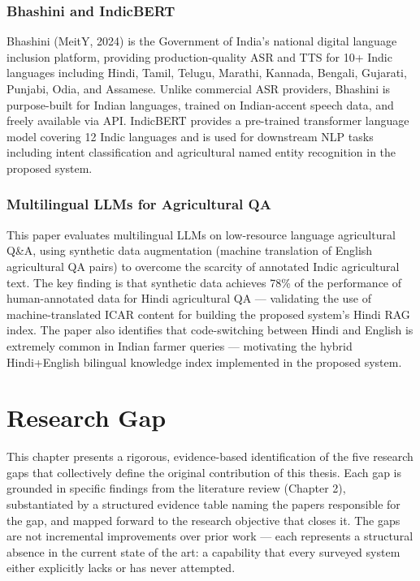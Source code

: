 \documentclass[12pt,a4paper]{article}
\begin{document}
\subsubsection{Bhashini and IndicBERT}
Bhashini (MeitY, 2024) is the Government of India's national digital language inclusion platform, providing production-quality ASR and TTS for 10+ Indic languages including Hindi, Tamil, Telugu, Marathi, Kannada, Bengali, Gujarati, Punjabi, Odia, and Assamese. Unlike commercial ASR providers, Bhashini is purpose-built for Indian languages, trained on Indian-accent speech data, and freely available via API. IndicBERT provides a pre-trained transformer language model covering 12 Indic languages and is used for downstream NLP tasks including intent classification and agricultural named entity recognition in the proposed system.

\subsubsection{Multilingual LLMs for Agricultural QA}
This paper evaluates multilingual LLMs on low-resource language agricultural Q\&A, using synthetic data augmentation (machine translation of English agricultural QA pairs) to overcome the scarcity of annotated Indic agricultural text. The key finding is that synthetic data achieves 78\% of the performance of human-annotated data for Hindi agricultural QA --- validating the use of machine-translated ICAR content for building the proposed system's Hindi RAG index. The paper also identifies that code-switching between Hindi and English is extremely common in Indian farmer queries --- motivating the hybrid Hindi+English bilingual knowledge index implemented in the proposed system.

\newpage

\section{Research Gap}
This chapter presents a rigorous, evidence-based identification of the five research gaps that collectively define the original contribution of this thesis. Each gap is grounded in specific findings from the literature review (Chapter 2), substantiated by a structured evidence table naming the papers responsible for the gap, and mapped forward to the research objective that closes it. The gaps are not incremental improvements over prior work --- each represents a structural absence in the current state of the art: a capability that every surveyed system either explicitly lacks or has never attempted.
\end{document}
